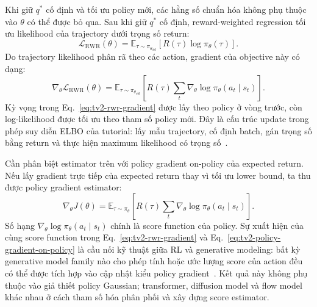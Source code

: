 Khi giữ $q^*$ cố định và tối ưu policy mới, các hằng số chuẩn hóa không phụ thuộc vào $\theta$ có thể được bỏ qua.
Sau khi giữ $q^*$ cố định, reward-weighted regression tối ưu likelihood của trajectory dưới trọng số return:
\begin{equation}
    \mathcal{L}_{\mathrm{RWR}}(\theta)
    =
    \mathbb{E}_{\tau\sim\pi_{\theta_{\mathrm{old}}}}
    \left[
        R(\tau)
        \log\pi_\theta(\tau)
    \right].
    \label{eq:tv2-rwr-objective}
\end{equation}
Do trajectory likelihood phân rã theo các action, gradient của objective này có dạng:
\begin{equation}
    \nabla_\theta\mathcal{L}_{\mathrm{RWR}}(\theta)
    =
    \mathbb{E}_{\tau\sim\pi_{\theta_{\mathrm{old}}}}
    \left[
        R(\tau)
        \sum_t
        \nabla_\theta
        \log\pi_\theta(a_t\mid s_t)
    \right].
    \label{eq:tv2-rwr-gradient}
\end{equation}
Kỳ vọng trong Eq.~\eqref{eq:tv2-rwr-gradient} được lấy theo policy ở vòng trước, còn log-likelihood được tối ưu theo tham số policy mới.
Đây là cấu trúc update trong phép suy diễn ELBO của tutorial: lấy mẫu trajectory, cố định batch, gán trọng số bằng return và thực hiện maximum likelihood có trọng số~\cite{peters2007rwr}.

Cần phân biệt estimator trên với policy gradient on-policy của expected return.
Nếu lấy gradient trực tiếp của expected return thay vì tối ưu lower bound, ta thu được policy gradient estimator:
\begin{equation}
    \nabla_\theta J(\theta)
    =
    \mathbb{E}_{\tau\sim\pi_\theta}
    \left[
        R(\tau)
        \sum_t
        \nabla_\theta
        \log\pi_\theta(a_t\mid s_t)
    \right].
    \label{eq:tv2-policy-gradient-on-policy}
\end{equation}
Số hạng $\nabla_\theta\log\pi_\theta(a_t\mid s_t)$ chính là score function của policy.
Sự xuất hiện của cùng score function trong Eq.~\eqref{eq:tv2-rwr-gradient} và Eq.~\eqref{eq:tv2-policy-gradient-on-policy} là cầu nối kỹ thuật giữa RL và generative modeling: bất kỳ generative model family nào cho phép tính hoặc ước lượng score của action đều có thể được tích hợp vào cập nhật kiểu policy gradient~\cite{williams1992reinforce}.
Kết quả này không phụ thuộc vào giả thiết policy Gaussian; transformer, diffusion model và flow model khác nhau ở cách tham số hóa phân phối và xây dựng score estimator.

